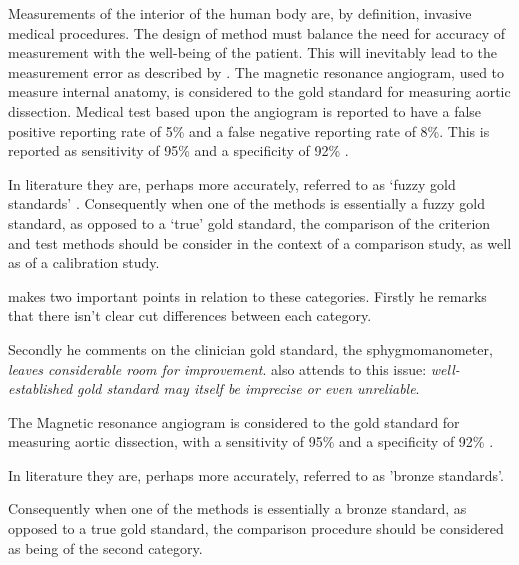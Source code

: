 \documentclass[12pt, a4paper]{report}
\theoremstyle{plain}
\theoremstyle{definition}
\theoremstyle{remark}
\begin{document}
Measurements of the interior of the human body are, by definition,
invasive medical procedures. The design of method must balance the
need for accuracy of measurement with the well-being of the
patient. This will inevitably lead to the measurement error as
described by \citet{DunnSEME}. The magnetic resonance angiogram,
used to measure internal anatomy,  is considered to the gold
standard for measuring aortic dissection. Medical test based upon
the angiogram is reported to have a false positive reporting rate
of 5\% and a false negative reporting rate of 8\%. This is
reported as sensitivity of 95\% and a specificity of 92\%
\citep{ACR}.

In literature they are, perhaps more accurately, referred to as
`fuzzy gold standards' \citep{phelps}. Consequently when one of the methods is
essentially a fuzzy gold standard, as opposed to a `true' gold
standard, the comparison of the criterion and test methods should
be consider in the context of a comparison study, as well as of a
calibration study.


	
	
	
	\citet{DunnSEME} makes two important points in relation to these
	categories. Firstly he remarks that there isn't clear cut differences between each category.
	
	Secondly he comments on the clinician gold standard, the
	sphygmomanometer, \emph{leaves considerable room for improvement}.
	\citet{pizzi} also attends to this issue: \emph{well-established
		gold standard may itself be imprecise or even unreliable}.
	
	The Magnetic resonance angiogram is considered to the gold
	standard for measuring aortic dissection, with a sensitivity of
	95\% and a specificity of 92\% . \citep{ACR}
	
	In literature they are, perhaps more accurately, referred to as 'bronze standards'.
	
	Consequently when one of the methods is essentially a bronze
	standard, as opposed to a true gold standard, the comparison
	procedure should be considered as being of the second category.
	
\end{document}
